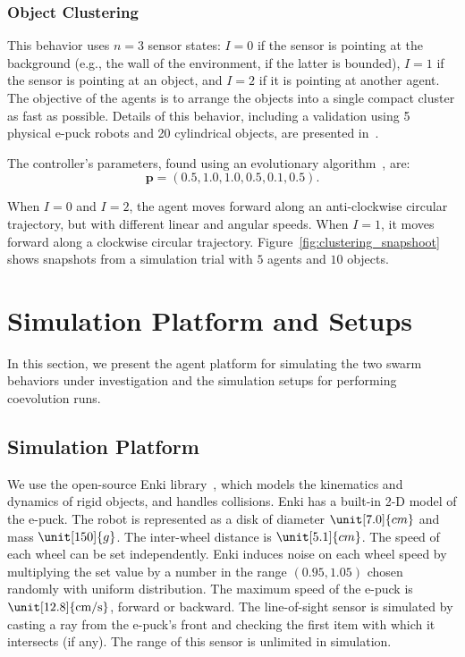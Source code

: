 \subsubsection{Object Clustering}
This behavior uses $n=3$ sensor states: $I=0$ if the sensor is pointing at the background (e.g., the wall of the environment, if the latter is bounded), $I=1$ if the sensor is pointing at an object, and $I=2$ if it is pointing at another agent. The objective of the agents is to arrange the objects into a single compact cluster as fast as possible. Details of this behavior, including a validation using 5 physical e-puck robots and 20 cylindrical objects, are presented in~\cite{Melvin2014_aamas}.

The controller's parameters, found using an evolutionary algorithm~\cite{Melvin2014_aamas}, are:
\begin{equation}\label{eq:clustering_optimal_controller}
\mathbf{p} = \left( 0.5, 1.0, 1.0, 0.5, 0.1, 0.5 \right).
\end{equation} 

When $I=0$ and $I=2$, the agent moves forward along an anti-clockwise circular trajectory, but with different linear and angular speeds. When $I=1$, it moves forward along a clockwise circular trajectory. Figure~\ref{fig:clustering_snapshoot} shows snapshots from a simulation trial with $5$ agents and $10$ objects.

\section{Simulation Platform and Setups}\label{sec:simulation_platform_setups}
 
In this section, we present the agent platform for simulating the two swarm behaviors under investigation and the simulation setups for performing coevolution runs.

\subsection{Simulation Platform}\label{sec:platform_swarm_simulation}

We use the open-source Enki library~\cite{Enki}, which models the kinematics and dynamics of rigid objects, and handles collisions. Enki has a built-in 2-D model of the e-puck. The robot is represented as a disk of diameter $\unit[7.0]{cm}$ and mass $\unit[150]{g}$. The inter-wheel distance is $\unit[5.1]{cm}$. The speed of each wheel can be set independently. Enki induces noise on each wheel speed by multiplying the set value by a number in the range $(0.95, 1.05)$ chosen randomly with uniform distribution. The maximum speed of the e-puck is $\unit[12.8]{\textrm{cm/s}}$, forward or backward. The line-of-sight sensor is simulated by casting a ray from the e-puck's front and checking the first item with which it intersects (if any). The range of this sensor is unlimited in simulation. 

